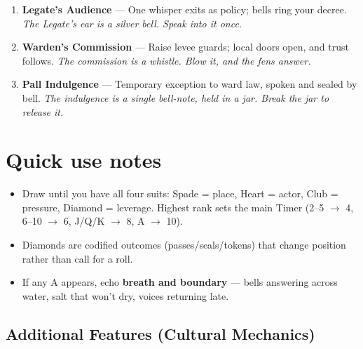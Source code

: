 \begin{enumerate}
  \hfill \textit{The right is a bell-rope. Tie it to your belt. Nonna will ask.}
\item[Q] \textbf{Legate's Audience} --- One whisper exits as policy; bells ring your decree. 
  \hfill \textit{The Legate's ear is a silver bell. Speak into it once.}
\item[K] \textbf{Warden's Commission} --- Raise levee guards; local doors open, and trust follows. 
  \hfill \textit{The commission is a whistle. Blow it, and the fens answer.}
\item[A] \textbf{Pall Indulgence} --- Temporary exception to ward law, spoken and sealed by bell.  
  \hfill \textit{The indulgence is a single bell-note, held in a jar. Break the jar to release it.}
\end{enumerate}

\section*{Quick use notes}
\label{sec:mistlands-quick-use}
\begin{itemize}
\item Draw until you have all four suits: Spade = place, Heart = actor, Club = pressure, Diamond = leverage. Highest rank sets the main Timer (2--5 $\rightarrow$ 4, 6--10 $\rightarrow$ 6, J/Q/K $\rightarrow$ 8, A $\rightarrow$ 10).
\item Diamonds are codified outcomes (passes/seals/tokens) that change position rather than call for a roll.
\item If any A appears, echo \textbf{breath and boundary} --- bells answering across water, salt that won't dry, voices returning late.
\end{itemize}

\subsection*{Additional Features (Cultural Mechanics)}
\label{sec:mistlands-mechanics}

